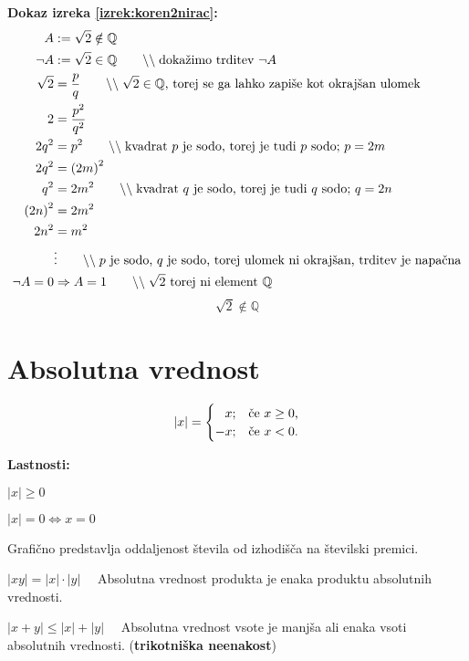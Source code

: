 \documentclass[a4paper,oneside,12pt,fleqn]{article}
\def\Q{\ensuremath{\mathbb Q}}
\newcommand\krat\cdot
\newcommand{\comment}[1]{\ensuremath{\qquad\backslash\backslash\;}\textnormal{#1}}
\renewcommand\iff\Leftrightarrow
\numberwithin{equation}{section}
\newenvironment{itemize*}%
{
\vspace{-12pt}%
\begin{itemize}%
\setlength{\itemsep}{0pt}%
\setlength{\parskip}{2pt}}%
{\end{itemize}}
\begin{document}
\textbf{Dokaz izreka \ref{izrek:koren2nirac}:} 
\begin{align*}
  A &:= \sqrt{2} \notin \Q \\
  \neg A &:= \sqrt{2} \in \Q  \comment{dokažimo trditev $\neg A$} \\
  \sqrt{2} &=  \frac{p}{q} \comment{$\sqrt{2} \in \Q$, torej se ga lahko zapiše kot okrajšan ulomek} \\
  2 &= \frac{p^2}{q^2} \\
  2q^2 &= p^2 \comment{kvadrat $p$ je sodo, torej je tudi $p$ sodo; $p = 2m$} \\
  2q^2 &= \left( 2m \right)^2 \\
  q^2 &= 2m^2 \comment{kvadrat $q$ je sodo, torej je tudi $q$ sodo; $q = 2n$} \\
  \left( 2n \right)^2 &=  2m^2 \\
  2n^2 &= m^2 \\
  &\vdots \comment{$p$ je sodo, $q$ je sodo, torej ulomek ni okrajšan, trditev je napačna} \\
  \neg A = 0 &\Rightarrow A = 1 \comment{$\sqrt{2}$ torej ni element \Q} \\
\end{align*}
\[  \sqrt{2} \notin \Q \]

\section{Absolutna vrednost}
\begin{equation}
  \label{eq:abs}
  \left| x \right| = 
  \begin{cases} 
    \hfill  x; & \text{če $x \geq 0$,} \\
    \hfill -x; & \text{če $x < 0$.}
  \end{cases}
\end{equation}

\textbf{Lastnosti:}
\begin{itemize*}
  \item $|x| \geq 0$
  \item $|x| = 0 \iff x = 0$
  \item Grafično predstavlja oddaljenost števila od izhodišča na številski premici.
  \item $|xy| = |x| \krat |y| \quad$ Absolutna vrednost produkta je enaka produktu
    absolutnih vrednosti.
  \item $|x+y| \leq |x| + |y| \quad$ Absolutna vrednost vsote je manjša ali enaka vsoti
    absolutnih vrednosti. (\textbf{trikotniška neenakost})
\end{itemize*}
\end{document}
